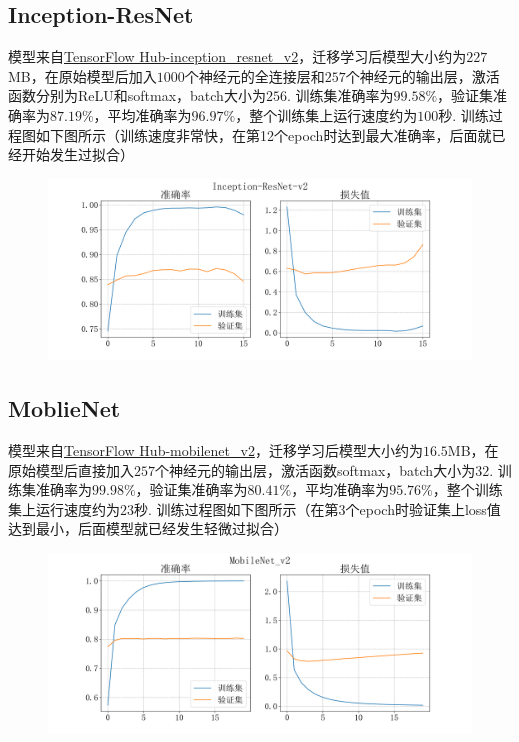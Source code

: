 \documentclass[12pt, a4paper, oneside]{ctexart}
\numberwithin{equation}{section}  %
\begin{document}
\subsection{Inception-ResNet}
模型来自\href{https://tfhub.dev/google/imagenet/inception_resnet_v2/classification/5}{TensorFlow Hub-inception\_resnet\_v2}，迁移学习后模型大小约为$227$MB，在原始模型后加入$1000$个神经元的全连接层和$257$个神经元的输出层，激活函数分别为ReLU和softmax，batch大小为$256$. 训练集准确率为$99.58\%$，验证集准确率为$87.19\%$，平均准确率为$96.97\%$，整个训练集上运行速度约为$100$秒. 训练过程图如下图所示（训练速度非常快，在第12个epoch时达到最大准确率，后面就已经开始发生过拟合）\vspace*{-0.3cm}
\begin{figure}[htbp]
  \hspace*{-0.8cm}
  \centering
  \includegraphics[scale=0.5]{model/inception_resnet_v2.png}
\end{figure}

\subsection{MoblieNet}
模型来自\href{https://tfhub.dev/google/tf2-preview/mobilenet_v2/classification/4}{TensorFlow Hub-mobilenet\_v2}，迁移学习后模型大小约为$16.5$MB，在原始模型后直接加入$257$个神经元的输出层，激活函数softmax，batch大小为$32$. 训练集准确率为$99.98\%$，验证集准确率为$80.41\%$，平均准确率为$95.76\%$，整个训练集上运行速度约为$23$秒. 训练过程图如下图所示（在第3个epoch时验证集上loss值达到最小，后面模型就已经发生轻微过拟合）\vspace*{-0.3cm}
\begin{figure}[htbp]
  \hspace*{-0.8cm}
  \centering
  \includegraphics[scale=0.5]{model/mobilenet_v2.png}
\end{figure}
\vspace*{-1cm}
\end{document}
